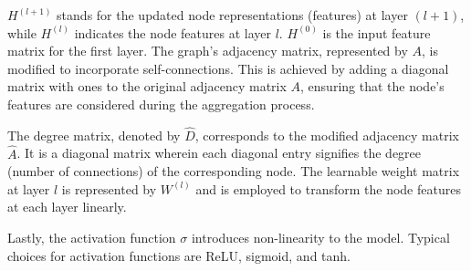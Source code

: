 $H^{(l+1)}$ stands for the updated node representations (features) at layer $(l+1)$, while $H^{(l)}$ indicates the node features at layer $l$. $H^{(0)}$ is the input feature matrix for the first layer. The graph's adjacency matrix, represented by $A$, is modified to incorporate self-connections. This is achieved by adding a diagonal matrix with ones to the original adjacency matrix $A$, ensuring that the node's features are considered during the aggregation process.

The degree matrix, denoted by $\hat{D}$, corresponds to the modified adjacency matrix $\hat{A}$. It is a diagonal matrix wherein each diagonal entry signifies the degree (number of connections) of the corresponding node. The learnable weight matrix at layer $l$ is represented by $W^{(l)}$ and is employed to transform the node features at each layer linearly.

Lastly, the activation function $\sigma$ introduces non-linearity to the model. Typical choices for activation functions are ReLU, sigmoid, and tanh.




